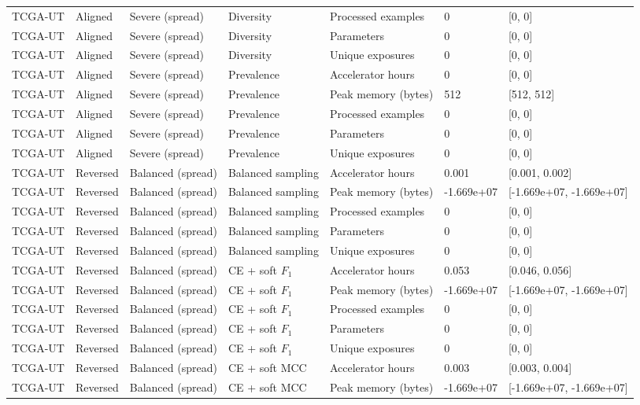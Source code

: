 \begin{longtable}{lllllll}
TCGA-UT & Aligned & Severe (spread) & Diversity & Processed examples & 0 & [0, 0] \\
TCGA-UT & Aligned & Severe (spread) & Diversity & Parameters & 0 & [0, 0] \\
TCGA-UT & Aligned & Severe (spread) & Diversity & Unique exposures & 0 & [0, 0] \\
TCGA-UT & Aligned & Severe (spread) & Prevalence & Accelerator hours & 0 & [0, 0] \\
TCGA-UT & Aligned & Severe (spread) & Prevalence & Peak memory (bytes) & 512 & [512, 512] \\
TCGA-UT & Aligned & Severe (spread) & Prevalence & Processed examples & 0 & [0, 0] \\
TCGA-UT & Aligned & Severe (spread) & Prevalence & Parameters & 0 & [0, 0] \\
TCGA-UT & Aligned & Severe (spread) & Prevalence & Unique exposures & 0 & [0, 0] \\
TCGA-UT & Reversed & Balanced (spread) & Balanced sampling & Accelerator hours & 0.001 & [0.001, 0.002] \\
TCGA-UT & Reversed & Balanced (spread) & Balanced sampling & Peak memory (bytes) & -1.669e+07 & [-1.669e+07, -1.669e+07] \\
TCGA-UT & Reversed & Balanced (spread) & Balanced sampling & Processed examples & 0 & [0, 0] \\
TCGA-UT & Reversed & Balanced (spread) & Balanced sampling & Parameters & 0 & [0, 0] \\
TCGA-UT & Reversed & Balanced (spread) & Balanced sampling & Unique exposures & 0 & [0, 0] \\
TCGA-UT & Reversed & Balanced (spread) & CE + soft $F_1$ & Accelerator hours & 0.053 & [0.046, 0.056] \\
TCGA-UT & Reversed & Balanced (spread) & CE + soft $F_1$ & Peak memory (bytes) & -1.669e+07 & [-1.669e+07, -1.669e+07] \\
TCGA-UT & Reversed & Balanced (spread) & CE + soft $F_1$ & Processed examples & 0 & [0, 0] \\
TCGA-UT & Reversed & Balanced (spread) & CE + soft $F_1$ & Parameters & 0 & [0, 0] \\
TCGA-UT & Reversed & Balanced (spread) & CE + soft $F_1$ & Unique exposures & 0 & [0, 0] \\
TCGA-UT & Reversed & Balanced (spread) & CE + soft MCC & Accelerator hours & 0.003 & [0.003, 0.004] \\
TCGA-UT & Reversed & Balanced (spread) & CE + soft MCC & Peak memory (bytes) & -1.669e+07 & [-1.669e+07, -1.669e+07] \\

\end{longtable}

